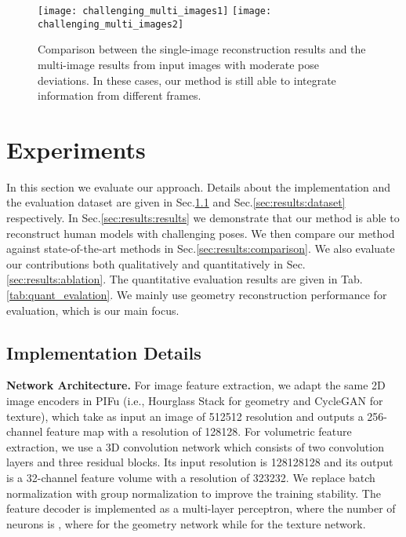 


\begin{figure*}
    \centering
    \texttt{[image: challenging\_multi\_images1]}
    \texttt{[image: challenging\_multi\_images2]}
    \caption{Comparison between the single-image reconstruction results and the multi-image results from input images with moderate pose deviations. In these  cases, our method is still able to integrate information from different frames.}
    \label{fig:challenging_multi_images}
\end{figure*}

\section{Experiments}
In this section we evaluate our approach. Details about the implementation and the evaluation dataset are given in Sec.\ref{sec:results:impl_details} and Sec.\ref{sec:results:dataset} respectively. In Sec.\ref{sec:results:results} we demonstrate that our method is able to reconstruct human models with challenging poses. We then compare our method against state-of-the-art methods in Sec.\ref{sec:results:comparison}. We also evaluate our contributions both qualitatively and quantitatively in Sec.\ref{sec:results:ablation}. The quantitative evaluation results are given in Tab.\ref{tab:quant_evalation}. We mainly use geometry reconstruction performance for evaluation, which is our main focus. 
\label{sec:results}


\subsection{Implementation Details}
\label{sec:results:impl_details}

\textbf{Network Architecture. } 
For image feature extraction, we adapt the same 2D image encoders in PIFu\cite{pifuSHNMKL19} (i.e., Hourglass Stack\cite{Hourglass16} for geometry and CycleGAN\cite{CycleGAN2017} for texture), which take as input an image of 512512 resolution and outputs a 256-channel feature map with a resolution of 128128. For volumetric feature extraction, we use a 3D convolution network which consists of two convolution layers and three residual blocks. Its input resolution is 128128128 and its output is a 32-channel feature volume with a resolution of 323232. We replace batch normalization with group normalization to improve the training stability. The  feature decoder is implemented as a multi-layer perceptron, where the number of neurons is , where  for the geometry network while   for the texture network. 

